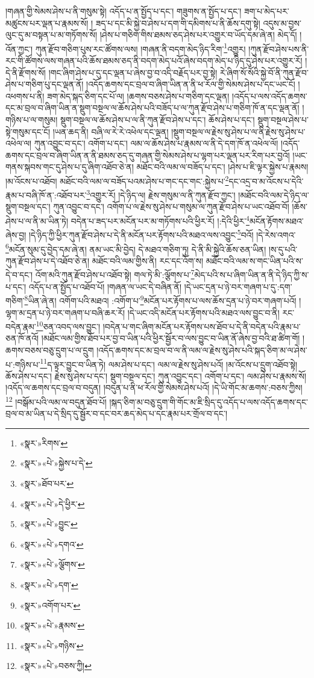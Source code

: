 །གཞན་གྱི་སེམས་ཤེས་པ་ནི་གསུམ་སྟེ། འདོད་པ་ན་སྤྱོད་པ་དང་། གཟུགས་ན་སྤྱོད་པ་དང་། ཟག་པ་མེད་པར་མཚུངས་པར་ལྡན་པ་རྣམས་སོ། །
ཟད་པ་དང་མི་སྐྱེ་བ་ཤེས་པ་དག་གི་དམིགས་པ་ནི་ཆོས་དགུ་སྟེ། འདུས་མ་བྱས་ལུང་དུ་མ་བསྟན་པ་མ་གཏོགས་སོ། །ཤེས་པ་གཅིག་གིས་ཐམས་ཅད་ཤེས་པར་འགྱུར་བ་ཡོད་དམ་ཞེ་ན། མེད་དོ། །འོན་ཀྱང་། ཀུན་རྫོབ་གཅིག་པུས་རང་ཚོགས་ལས། །གཞན་ནི་བདག་མེད་ཉིད་རིག་\footnote{«སྣར་»རིགས་}འགྱུར། །ཀུན་རྫོབ་ཤེས་པས་ནི་རང་གི་ཚོགས་ལས་གཞན་པའི་ཆོས་ཐམས་ཅད་ནི་བདག་མེད་པའོ་ཞེས་བདག་མེད་པ་ཉིད་དུ་ཤེས་པར་འགྱུར་རོ། །དེ་ནི་རྫོགས་སོ། །གང་ཞིག་ཤེས་པ་དུ་དང་ལྡན་པ་ཞེས་བྱ་བ་འདི་བརྗོད་པར་བྱ་སྟེ། རེ་ཞིག་སོ་སོའི་སྐྱེ་བོ་ནི་ཀུན་རྫོབ་ཤེས་པ་གཅིག་པུ་དང་ལྡན་ནོ། །འདོད་ཆགས་དང་བྲལ་བ་ཞིག་ཡིན་ན་ནི་ཕ་རོལ་གྱི་སེམས་ཤེས་པ་དང་ཡང་ངོ། །འཕགས་པ་ནི། ཟག་མེད་སྐད་ཅིག་དང་པོ་ལ། །ཆགས་བཅས་ཤེས་པ་གཅིག་དང་ལྡན། །འདོད་པ་ལས་འདོད་ཆགས་དང་མ་བྲལ་བ་ཞིག་ཡིན་ན་སྡུག་བསྔལ་ལ་ཆོས་ཤེས་པའི་བཟོད་པ་ལ་ཀུན་རྫོབ་ཤེས་པ་གཅིག་ཁོ་ན་དང་ལྡན་ནོ། །གཉིས་པ་ལ་གསུམ། སྡུག་བསྔལ་ལ་ཆོས་ཤེས་པ་ལ་ནི་ཀུན་རྫོབ་ཤེས་པ་དང་། ཆོས་ཤེས་པ་དང་། སྡུག་བསྔལ་ཤེས་པ་སྟེ་གསུམ་དང་ངོ། །ཡན་ཆད་ནི། བཞི་ལ་རེ་རེ་འཕེལ་དང་ལྡན། །སྡུག་བསྔལ་ལ་རྗེས་སུ་ཤེས་པ་ལ་ནི་རྗེས་སུ་ཤེས་པ་འཕེལ་ལ། ཀུན་འབྱུང་བ་དང་། འགོག་པ་དང་། ལམ་ལ་ཆོས་ཤེས་པ་རྣམས་ལ་ནི་དེ་དག་ཁོ་ན་འཕེལ་ལོ། །འདོད་ཆགས་དང་བྲལ་བ་ཞིག་ཡིན་ན་ནི་ཐམས་ཅད་དུ་གཞན་གྱི་སེམས་ཤེས་པ་ལྷག་པར་ལྡན་པར་རིག་པར་བྱའོ། །ཡང་གནས་སྐབས་གང་དུ་ཤེས་པ་དུ་ཞིག་འཐོབ་ཅེ་ན། མཐོང་བའི་ལམ་ལ་བཟོད་པ་དང་། །ཤེས་པ་ཇི་ལྟར་སྐྱེས་པ་རྣམས། །མ་འོངས་པ་འཐོབ། མཐོང་བའི་ལམ་ལ་བཟོད་པའམ་ཤེས་པ་གང་དང་གང་:སྐྱེས་པ་\footnote{«སྣར་»«པེ་»སྐྱེས་པ་དེ་}དང་འདྲ་བ་མ་འོངས་པ་དེའི་རྣམ་པ་བཞི་ཁོ་ན་:འཐོབ་པར་\footnote{«སྣར་»ཐོབ་པར་}འགྱུར་རོ། །དེ་ཉིད་ལ། རྗེས་གསུམ་ལ་ནི་ཀུན་རྫོབ་ཀྱང་། །མཐོང་བའི་ལམ་དེ་ཉིད་ལ་སྡུག་བསྔལ་དང་། ཀུན་འབྱུང་བ་དང་། འགོག་པ་ལ་རྗེས་སུ་ཤེས་པ་གསུམ་ལ་ཀུན་རྫོབ་ཤེས་པ་ཡང་འཐོབ་བོ། །ཆོས་ཤེས་པ་ལ་ནི་མ་ཡིན་ཏེ། བདེན་པ་ཟད་པར་མངོན་པར་མ་གཏོགས་པའི་ཕྱིར་རོ། །:དེའི་ཕྱིར་\footnote{«སྣར་»«པེ་»དེ་ཕྱིར་}མངོན་རྟོགས་མཐའ་ཞེས་བྱ། །དེ་ཉིད་ཀྱི་ཕྱིར་ཀུན་རྫོབ་ཤེས་པ་དེ་ནི་མངོན་པར་རྟོགས་པའི་མཐའ་ལས་འབྱུང་\footnote{«སྣར་»«པེ་»བྱུང་}བའོ། །དེ་རེས་འགའ་\footnote{«སྣར་»«པེ་»དགའ་}མངོན་སུམ་དུ་བྱེད་དམ་ཞེ་ན། ནམ་ཡང་མི་བྱེད། དེ་མཐའ་གཅིག་ཏུ། དེ་ནི་མི་སྐྱེའི་ཆོས་ཅན་ཡིན། །ས་དུ་པའི་ཀུན་རྫོབ་ཤེས་པ་དེ་འཐོབ་ཅེ་ན། མཐོང་བའི་ལམ་གྱིས་ནི། རང་དང་འོག་ས། མཐོང་བའི་ལམ་ས་གང་ཡིན་པའི་ས་དེ་བ་དང་། འོག་མའི་ཀུན་རྫོབ་ཤེས་པ་འཐོབ་སྟེ། གལ་ཏེ་མི་:ལྕོགས་པ་\footnote{«སྣར་»«པེ་»ལྕོགས་}མེད་པའི་ས་པ་ཞིག་ཡིན་ན་ནི་དེ་ཉིད་ཀྱི་ས་པ་དང་། འདོད་པ་ན་སྤྱོད་པ་འཐོབ་པོ། །གཞན་ལ་ཡང་དེ་བཞིན་ནོ། །དེ་ཡང་དྲན་པ་ཉེ་བར་གཞག་པ་དུ་:དག་གཅིག་\footnote{«སྣར་»«པེ་»དག་}ཡིན་ཞེ་ན། འགོག་པའི་མཐའ། :འགོག་པ་\footnote{«སྣར་»འགོག་པར་}མངོན་པར་རྟོགས་པ་ལས་ཆོས་དྲན་པ་ཉེ་བར་གཞག་པའོ། །ལྷག་མ་དྲན་པ་ཉེ་བར་གཞག་པ་བཞི་ཆར་རོ། །དེ་ཡང་འདི་མངོན་པར་རྟོགས་པའི་མཐའ་ལས་བྱུང་བ་ནི། རང་བདེན་རྣམ་\footnote{«སྣར་»«པེ་»རྣམས་}ཅན་འབད་ལས་བྱུང་། །བདེན་པ་གང་ཞིག་མངོན་པར་རྟོགས་པས་ཐོབ་པ་དེ་ནི་བདེན་པའི་རྣམ་པ་ཅན་ཁོ་ནའོ། །མཐོང་ལམ་གྱིས་ཐོབ་པར་བྱ་བ་ཡིན་པའི་ཕྱིར་སྦྱོར་བ་ལས་བྱུང་བ་ཡིན་ནོ་ཞེས་བྱ་བའི་ཐ་ཚིག་གོ། །ཆགས་བཅས་བཅུ་དྲུག་པ་ལ་དྲུག །འདོད་ཆགས་དང་མ་བྲལ་བ་ལ་ནི་ལམ་ལ་རྗེས་སུ་ཤེས་པའི་སྐད་ཅིག་མ་ལ་ཤེས་པ་:གཉིས་པ་\footnote{«སྣར་»«པེ་»གཉིས་}ད་ལྟར་བྱུང་བ་ཡིན་ཏེ། ལམ་ཤེས་པ་དང་། ལམ་ལ་རྗེས་སུ་ཤེས་པའོ། །མ་འོངས་པ་དྲུག་འཐོབ་སྟེ། ཆོས་ཤེས་པ་དང་། རྗེས་སུ་ཤེས་པ་དང་། སྡུག་བསྔལ་དང་། ཀུན་འབྱུང་དང་། འགོག་པ་དང་། ལམ་ཤེས་པ་རྣམས་སོ། །འདོད་ལ་ཆགས་དང་བྲལ་བ་བདུན། །བདུན་པ་ནི་ཕ་རོལ་གྱི་སེམས་ཤེས་པའོ། །དེ་ཡི་གོང་མ་ཆགས་:བཅས་ཀྱིས།\footnote{«སྣར་»«པེ་»བཅས་ཀྱི།} །བསྒོམ་པའི་ལམ་ལ་བདུན་ཐོབ་པོ། །སྐད་ཅིག་མ་བཅུ་དྲུག་གི་གོང་མ་ཇི་སྲིད་དུ་འདོད་པ་ལས་འདོད་ཆགས་དང་བྲལ་བ་མ་ཡིན་པ་དེ་སྲིད་དུ་སྦྱོར་བ་དང་བར་ཆད་མེད་པ་དང་རྣམ་པར་གྲོལ་བ་དང་། 